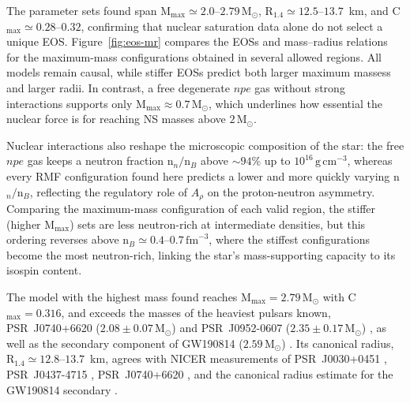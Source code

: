 \documentclass[10pt,letter,twoside]{rmat-rho}
\begin{document}
The parameter sets found span M$_\text{max}\simeq2.0$--$2.79\,\mathrm{M}_\odot$, R$_{1.4}\simeq12.5$--$13.7$~km, and C$_\text{max}\simeq0.28$--$0.32$, confirming that nuclear saturation data alone do not select a unique EOS. Figure~\ref{fig:eos-mr} compares the EOSs and mass--radius relations for the maximum-mass configurations obtained in several allowed regions. All models remain causal, while stiffer EOSs predict both larger maximum massess and larger radii. In contrast, a free degenerate $npe$ gas without strong interactions supports only M$_\text{max}\approx0.7\,\mathrm{M}_\odot$, which underlines how essential the nuclear force is for reaching NS masses above $2\,\mathrm{M}_\odot$.

Nuclear interactions also reshape the microscopic composition of the star: the free $npe$ gas keeps a neutron fraction n$_n/\text{n}_B$ above $\sim94\%$ up to $10^{16}\,\mathrm{g\,cm^{-3}}$, whereas every RMF configuration found here predicts a lower and more quickly varying n$_n/\text{n}_B$, reflecting the regulatory role of $A_\rho$ on the proton-neutron asymmetry. Comparing the maximum-mass configuration of each valid region, the stiffer (higher M$_\text{max}$) sets are less neutron-rich at intermediate densities, but this ordering reverses above n$_B\simeq0.4$--$0.7\,\text{fm}^{-3}$, where the stiffest configurations become the most neutron-rich, linking the star's mass-supporting capacity to its isospin content.

The model with the highest mass found reaches M$_\text{max}=2.79\,\mathrm{M}_\odot$ with C$_\text{max}=0.316$, and exceeds the masses of the heaviest pulsars known, PSR~J0740+6620 ($2.08\pm0.07\,\mathrm{M}_\odot$) \citep{fonsecaRefinedMassGeometric2021} and PSR~J0952-0607 ($2.35\pm0.17\,\mathrm{M}_\odot$) \citep{romaniPSRJ09520607Fastest2022}, as well as the secondary component of GW190814 ($2.59\,\mathrm{M}_\odot$) \citep{theligoscientificcollaborationGW190814GravitationalWaves2020}. Its canonical radius, R$_{1.4}\simeq12.8$--$13.7$~km, agrees with NICER measurements of PSR~J0030+0451 \citep{millerPSRJ0030+0451Mass2019}, PSR~J0437-4715 \citep{choudhuryNICERViewNearest2024b}, PSR~J0740+6620 \citep{millerRadiusPSRJ0740+66202021}, and the canonical radius estimate for the GW190814 secondary \citep{biswasGW190814PropertiesSecondary2021}.
\end{document}
